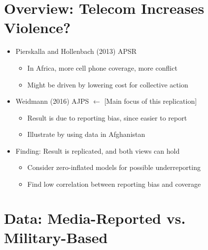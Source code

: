 \documentclass[article,36pt,extrafontsizes,oneside,openany,oldfontcommands]{memoir}
\begin{document}
\begin{adjmulticols*}{3}{0.5in}{0.5in}
\color{bodytextcol}

\section{Overview: Telecom Increases Violence?}

\begin{adjustwidth}{0.1in}{0.1in}
\begin{itemize}[topsep=0pt,itemsep=0ex,partopsep=1ex,parsep=1ex]
\item Pierskalla and Hollenbach (2013) APSR
\vspace{-.2in}
\begin{itemize}[topsep=0pt,itemsep=-1ex,partopsep=0ex,parsep=1ex] 
\item In Africa, more cell phone coverage, more conflict
\item Might be driven by lowering cost for collective action
\end{itemize}
\item Weidmann (2016) AJPS \hfill $\leftarrow$ \hfill [Main focus of this replication]
\vspace{-.2in}
\begin{itemize}[topsep=0pt,itemsep=-1ex,partopsep=0ex,parsep=1ex] 
\item Result is due to reporting bias, since easier to report
\item Illustrate by using data in Afghanistan
\end{itemize} 
\item Finding: Result is replicated, and both views can hold
\vspace{-.2in}
\begin{itemize}[topsep=0pt,itemsep=-1ex,partopsep=0ex,parsep=1ex] 
\item Consider zero-inflated models for possible underreporting
\item Find low correlation between reporting bias and coverage
\end{itemize} 
\end{itemize} 
\end{adjustwidth}

\section{Data: Media-Reported vs. Military-Based}


\end{adjmulticols*}
\end{document}
